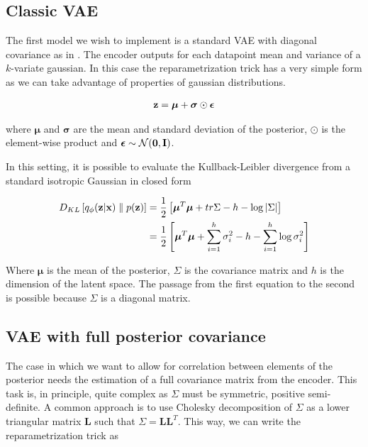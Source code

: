 \documentclass[12pt]{article}
\begin{document}
\subsection{Classic VAE}

The first model we wish to implement is a standard VAE with diagonal covariance as in \cite{kingma2022autoencoding}. The encoder outputs for each datapoint mean and variance of a \(k\)-variate gaussian. In this case the reparametrization trick has a very simple form as we can take advantage of properties of gaussian distributions.

\begin{align}
    \textbf{z} = \boldsymbol{\mu} + \boldsymbol{\sigma} \odot \bm{\epsilon}
\end{align}

where \(\boldsymbol{\mu}\) and \(\boldsymbol{\sigma}\) are the mean and standard deviation of the posterior, \(\odot\) is the element-wise product and \(\bm{\epsilon} \sim \mathcal{N}(\textbf{0}, \textbf{I})\). 


In this setting, it is possible to evaluate the Kullback-Leibler divergence from a standard isotropic Gaussian in closed form

\begin{align}
    D_{KL} \left[ q_{\phi}(\textbf{z}|\textbf{x}) \parallel p(\textbf{z}) \right] &= \frac{1}{2}\left[\boldsymbol{\mu}^T \boldsymbol{\mu} + tr{\Sigma} - h - \log \left| \Sigma \right| \right] \nonumber \\
    &= \frac{1}{2}\left[\boldsymbol{\mu}^T \boldsymbol{\mu} + \sum_{i=1}^h \sigma_{i}^2 - h - \sum_{i=1}^h \log\sigma_{i}^2\right]
\end{align}

Where \(\boldsymbol{\mu}\) is the mean of the posterior, \(\Sigma\) is the covariance matrix and \(h\) is the dimension of the latent space. The passage from the first equation to the second is possible because \(\Sigma\) is a diagonal matrix. 

\subsection{VAE with full posterior covariance}

The case in which we want to allow for correlation between elements of the posterior needs the estimation of a full covariance matrix from the encoder. This task is, in principle, quite complex as \(\Sigma\) must be symmetric, positive semi-definite. A common approach \cite{VAEIntro} is to use Cholesky decomposition of \(\Sigma\) as a lower triangular matrix \(\mathbf{L}\) such that \(\Sigma = \mathbf{L}\mathbf{L}^T\). This way, we can write the reparametrization trick as
\end{document}
